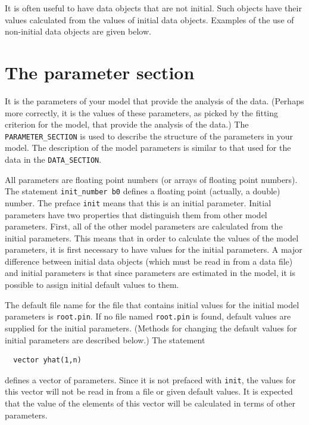 \documentclass{admbmanual}
\newcommand\DS{\texttt{DATA\_SECTION}}
\begin{document}
It is often useful to have data objects that are not initial. Such objects have
their values calculated from the values of initial data objects. Examples of the
use of non-initial data objects are given below.

\section{The parameter section}

It is the parameters of your model that provide the analysis of the data.
(Perhaps more correctly, it is the values of these parameters, as picked by the
fitting criterion for the model, that provide the analysis of the data.) The
\texttt{PARAMETER\_SECTION} is used to describe the structure of the parameters
in your model. The description of the model parameters is similar to that used
for the data in the \DS.

All parameters are floating point numbers (or arrays of floating point numbers).
The statement \texttt{init\_number b0} defines a floating point (actually, a
double) number. The preface \texttt{init} means that this is an initial
parameter. Initial parameters have two properties that distinguish them from
other model parameters. First, all of the other model parameters are calculated
from the initial parameters. This means that in order to calculate the values of
the model parameters, it is first necessary to have values for the initial
parameters. A major difference between initial data objects (which must be read
in from a data file) and initial parameters is that since parameters are
estimated in the model, it is possible to assign initial default values to them.

The default file name for the file that contains initial values for the initial
model parameters is \texttt{root.pin}. If no file named \texttt{root.pin} is
found, default values are supplied for the initial parameters. (Methods for
changing the default values for initial parameters are described below.) The
statement
\begin{lstlisting}
  vector yhat(1,n)
\end{lstlisting}
defines a vector of parameters. Since it is not prefaced with \texttt{init}, the
values for this vector will not be read in from a file or given default values.
It is expected that the value of the elements of this vector will be calculated
in terms of other parameters.
\end{document}
